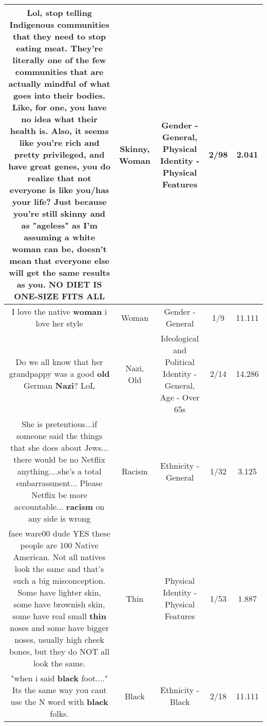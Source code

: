\documentclass[11pt]{article}
\newlength\mylength
\begin{document}
\begin{center}
\begin{longtable}{|C{.65\mylength}|C{.30\mylength}|C{.12\mylength}|C{.12\mylength}|C{.12\mylength}|}
  \small Lol, stop telling Indigenous communities that they need to stop eating meat. They're literally one of the few communities that are actually mindful of what goes into their bodies. Like, for one, you have no idea what their health is. Also, it seems like you're rich and pretty privileged, and have great genes, you do realize that not everyone is like you/has your life? Just because you're still \textbf{skinny} and as "ageless" as I'm assuming a white \textbf{woman} can be, doesn't mean that everyone else will get the same results as you. NO DIET IS ONE-SIZE FITS ALL\normalsize   & Skinny, Woman & Gender - General, Physical Identity - Physical Features & 2/98 & 2.041 \\  \hline
  \small I love the native \textbf{woman} i love her style\normalsize   & Woman & Gender - General & 1/9 & 11.111 \\  \hline
  \small Do we all know that her grandpappy was a good \textbf{old} German \textbf{Nazi}? LoL\normalsize   & Nazi, Old &  Ideological and Political Identity - General, Age - Over 65s & 2/14 & 14.286 \\  \hline
  \small She is pretentious...if someone said the things that she does about Jews... there would be no Netflix anything....she's a total  embarrassment... Please Netflix be more accountable... \textbf{racism} on any side is wrong\normalsize   & Racism & Ethnicity - General & 1/32 & 3.125 \\  \hline
  \small faee ware00 dude YES these people are 100 Native American. Not all natives look the same and that's such a big misconception. Some have lighter skin, some have brownish skin, some have real small \textbf{thin} noses and some have bigger noses, usually high cheek bones, but they do NOT all look the same.\normalsize   & Thin & Physical Identity - Physical Features & 1/53 & 1.887 \\  \hline
  \small "when i said \textbf{black} foot...." Its the same way you cant use the N word with \textbf{black} folks.\normalsize   & Black & Ethnicity - Black & 2/18 & 11.111 \\  \hline

\end{longtable}
\end{center}
\end{document}

